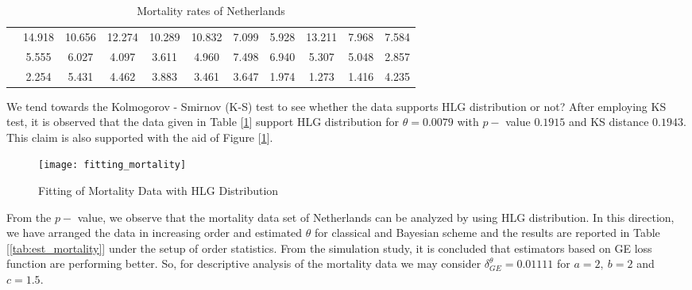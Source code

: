 \documentclass[11pt,a4paper]{article}
\numberwithin{equation}{section}
\begin{document}
	\begin{table}[h]

		\centering

		\caption{Mortality rates of Netherlands}

		\begin{tabular}{ccccccccccc}

			\toprule

			& 14.918 & 10.656 & 12.274 & 10.289 & 10.832 & 7.099 & 5.928 & 13.211 & 7.968 & 7.584\\

			& 5.555 & 6.027 & 4.097 & 3.611 & 4.960 & 7.498 & 6.940 & 5.307 & 5.048 & 2.857\\

			& 2.254 & 5.431 & 4.462 & 3.883 & 3.461 & 3.647 & 1.974 & 1.273 & 1.416 & 4.235\\

			\bottomrule

		\end{tabular} 

		\label{tab:realdata1}

	\end{table} 

	We tend towards the Kolmogorov - Smirnov (K-S) test to see whether the data supports HLG distribution or not? After employing KS test, it is observed that the data given in Table [\ref{tab:realdata1}] support HLG distribution for $\theta = 0.0079$ with $p-$ value $0.1915$ and KS distance  $0.1943$. This claim is also supported with the aid of Figure [\ref{fig:fittingmortality}].

	\begin{figure}

		\centering

		\texttt{[image: fitting\_mortality]}

		\caption{Fitting of Mortality Data with HLG Distribution}

		\label{fig:fittingmortality}

	\end{figure}

	From the $p-$ value, we observe that the mortality data set of Netherlands can be analyzed by using HLG distribution. In this direction, we have arranged the data in increasing order and estimated $\theta$ for classical and Bayesian scheme and the results are reported in Table [\ref{tab:est_mortality}] under the setup of order statistics. From the simulation study, it is concluded that estimators based on GE loss function are performing better. So, for descriptive analysis of the mortality data we may consider $\delta^\theta_{GE}=0.01111$ for $a=2,~b=2$ and $c=1.5.$ 
\end{document}
